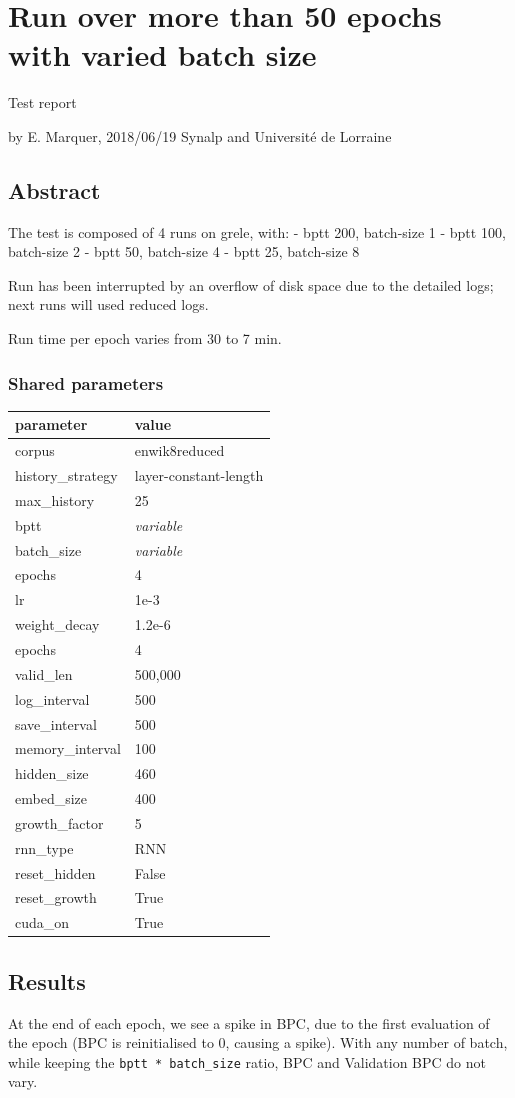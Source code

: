 \section{Run over more than 50 epochs with varied batch
size}\label{run-over-more-than-50-epochs-with-varied-batch-size}

Test report

by E. Marquer, 2018/06/19 Synalp and Université de Lorraine

\subsection{Abstract}\label{abstract}

The test is composed of 4 runs on grele, with: - bptt 200, batch-size 1
- bptt 100, batch-size 2 - bptt 50, batch-size 4 - bptt 25, batch-size 8

Run has been interrupted by an overflow of disk space due to the
detailed logs; next runs will used reduced logs.

Run time per epoch varies from 30 to 7 min.

\subsubsection{Shared parameters}\label{shared-parameters}

\begin{longtable}[]{@{}ll@{}}
\toprule
parameter & value\tabularnewline
\midrule
\endhead
corpus & enwik8reduced\tabularnewline
history\_strategy & layer-constant-length\tabularnewline
max\_history & 25\tabularnewline
bptt & \emph{variable}\tabularnewline
batch\_size & \emph{variable}\tabularnewline
epochs & 4\tabularnewline
lr & 1e-3\tabularnewline
weight\_decay & 1.2e-6\tabularnewline
epochs & 4\tabularnewline
valid\_len & 500,000\tabularnewline
log\_interval & 500\tabularnewline
save\_interval & 500\tabularnewline
memory\_interval & 100\tabularnewline
hidden\_size & 460\tabularnewline
embed\_size & 400\tabularnewline
growth\_factor & 5\tabularnewline
rnn\_type & RNN\tabularnewline
reset\_hidden & False\tabularnewline
reset\_growth & True\tabularnewline
cuda\_on & True\tabularnewline
\bottomrule
\end{longtable}

\subsection{Results}\label{results}

At the end of each epoch, we see a spike in BPC, due to the first
evaluation of the epoch (BPC is reinitialised to 0, causing a spike).
With any number of batch, while keeping the
\lstinline!bptt * batch_size! ratio, BPC and Validation BPC do not vary.

